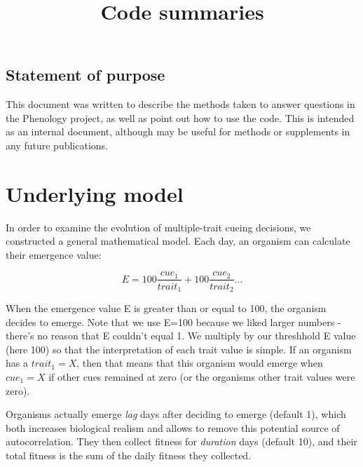 \documentclass[10pt,a4paper]{article}
\title{Code summaries}
\begin{document}
\maketitle
\subsection{Statement of purpose}
This document was written to describe the methods taken to answer questions in the Phenology project, as well as point out how to use the code. This is intended as an internal document, although may be useful for methods or supplements in any future publications.

\section{Underlying model}

In order to examine the evolution of multiple-trait cueing decisions, we constructed a general mathematical model. Each day, an organism can calculate their emergence value:

\[
E=100\frac{cue_1}{trait_1}+100\frac{cue_2}{trait_2}\dots
\]

When the emergence value E is greater than or equal to 100, the organism decides to emerge. Note that we use E=100 because we liked larger numbers - there's no reason that E couldn't equal 1. We multiply by our threshhold E value (here 100) so that the interpretation of each trait value is simple. If an organism has a $trait_1=X$, then that means that this organism would emerge when $cue_1=X$ if other cues remained at zero (or the organisms other trait values were zero). 

Organisms actually emerge \textit{lag} days after deciding to emerge (default 1), which both increases biological realism and allows to remove this potential source of autocorrelation. They then collect fitness for \textit{duration} days (default 10), and their total fitness is the sum of the daily fitness they collected. 
\end{document}
